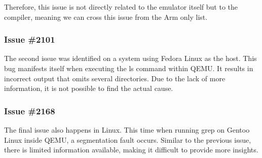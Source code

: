 Therefore, this issue is not directly related to the emulator itself but to the compiler, meaning we can cross this issue from the Arm only list.

\subsubsection{Issue \#2101}
The second issue was identified on a system using Fedora Linux as the host.
This bug manifests itself when executing the ls command within \ac{QEMU}.
It results in incorrect output that omits several directories.
Due to the lack of more information, it is not possible to find the actual cause.

\subsubsection{Issue \#2168}
The final issue also happens in Linux.
This time when running grep on Gentoo Linux inside \ac{QEMU}, a segmentation fault occurs.
Similar to the previous issue, there is limited information available, making it difficult to provide more insights.



